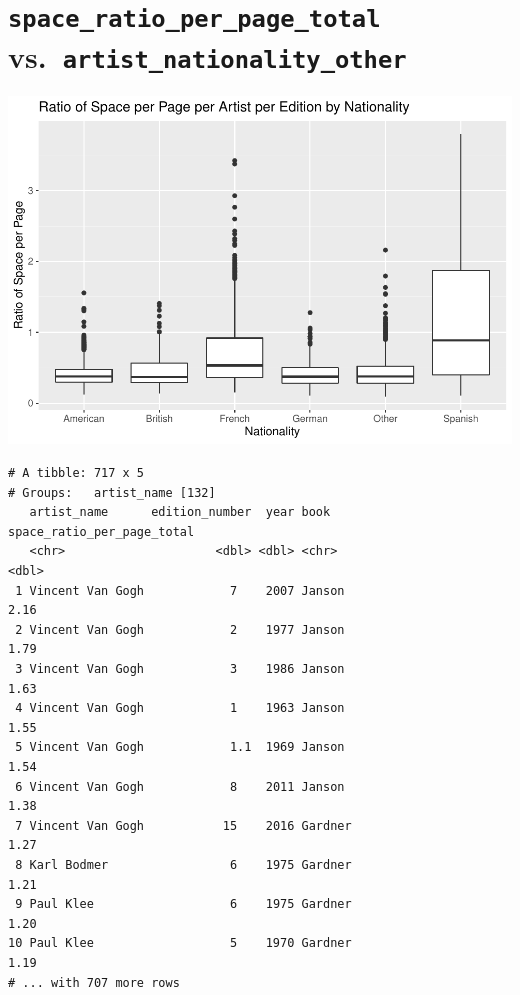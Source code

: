 \documentclass[
  letterpaper,
  DIV=11,
  numbers=noendperiod]{scrreprt}
\begin{document}
\hypertarget{space_ratio_per_page_total-vs.-artist_nationality_other}{%
\section{\texorpdfstring{\texttt{space\_ratio\_per\_page\_total}
vs.~\texttt{artist\_nationality\_other}}{space\_ratio\_per\_page\_total vs.~artist\_nationality\_other}}\label{space_ratio_per_page_total-vs.-artist_nationality_other}}

\includegraphics{Chapter1/Chapter1_files/figure-pdf/nationalityotherallbooks-1.pdf}

\begin{verbatim}
# A tibble: 717 x 5
# Groups:   artist_name [132]
   artist_name      edition_number  year book    space_ratio_per_page_total
   <chr>                     <dbl> <dbl> <chr>                        <dbl>
 1 Vincent Van Gogh            7    2007 Janson                        2.16
 2 Vincent Van Gogh            2    1977 Janson                        1.79
 3 Vincent Van Gogh            3    1986 Janson                        1.63
 4 Vincent Van Gogh            1    1963 Janson                        1.55
 5 Vincent Van Gogh            1.1  1969 Janson                        1.54
 6 Vincent Van Gogh            8    2011 Janson                        1.38
 7 Vincent Van Gogh           15    2016 Gardner                       1.27
 8 Karl Bodmer                 6    1975 Gardner                       1.21
 9 Paul Klee                   6    1975 Gardner                       1.20
10 Paul Klee                   5    1970 Gardner                       1.19
# ... with 707 more rows
\end{verbatim}
\end{document}
